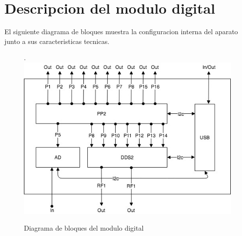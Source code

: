 \section{Descripcion del modulo digital}

El siguiente diagrama de bloques muestra la configuracion interna del aparato junto a sus caracteristicas tecnicas.

\begin{figure}[!htb].
    \includegraphics[width=\linewidth]{../figures/d6.jpg}
    \caption{Diagrama de bloques del modulo digital}
    \label{fig:d1}
\end{figure}


\newpage
